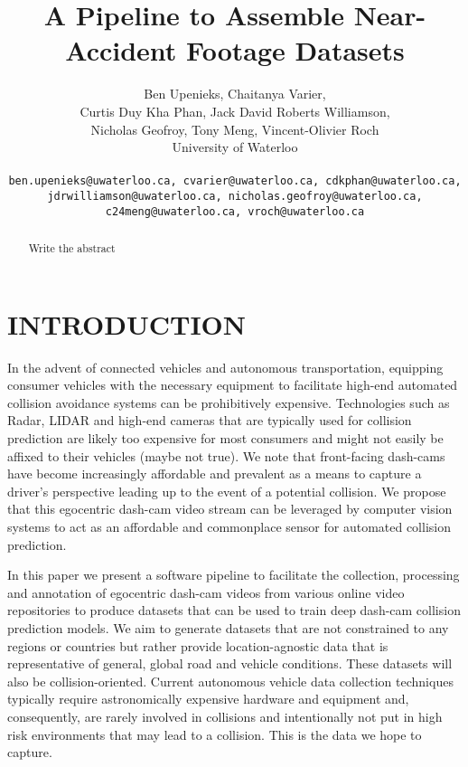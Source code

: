 \documentclass[letterpaper, 10 pt, conference]{IEEEconf}
\title{\LARGE \bf
A Pipeline to Assemble Near-Accident Footage Datasets
}
\author{
         Ben Upenieks, Chaitanya Varier,\\
         Curtis Duy Kha Phan, Jack David Roberts Williamson,\\
         Nicholas Geofroy, Tony Meng, Vincent-Olivier Roch\\
         University of Waterloo\\
         \\
         {\tt\small ben.upenieks@uwaterloo.ca, cvarier@uwaterloo.ca, cdkphan@uwaterloo.ca,
          jdrwilliamson@uwaterloo.ca, nicholas.geofroy@uwaterloo.ca, c24meng@uwaterloo.ca, vroch@uwaterloo.ca}
}
\newcommand{\todo}[1]{{\color{red}#1}}
\begin{document}
\maketitle
\thispagestyle{empty}
\pagestyle{empty}


\begin{abstract}

\todo{Write the abstract}

\end{abstract}

\section{INTRODUCTION}

In the advent of connected vehicles and autonomous transportation, equipping consumer vehicles with the necessary equipment to facilitate high-end automated collision avoidance systems can be prohibitively expensive. Technologies such as Radar, LIDAR and high-end cameras that are typically used for collision prediction are likely too expensive for most consumers and might not easily be affixed to their vehicles (maybe not true). We note that front-facing dash-cams have become increasingly affordable and prevalent as a means to capture a driver’s perspective leading up to the event of a potential collision. We propose that this egocentric dash-cam video stream can be leveraged by computer vision systems to act as an affordable and commonplace sensor for automated collision prediction. 

In this paper we present a software pipeline to facilitate the collection, processing and annotation of egocentric dash-cam videos from various online video repositories to produce datasets that can be used to train deep dash-cam collision prediction models. We aim to generate datasets that are not constrained to any regions or countries but rather provide location-agnostic data that is representative of general, global road and vehicle conditions. These datasets will also be collision-oriented. Current autonomous vehicle data collection techniques typically require astronomically expensive hardware and equipment and, consequently, are rarely involved in collisions and intentionally not put in high risk environments that may lead to a collision. This is the data we hope to capture.

\end{document}
